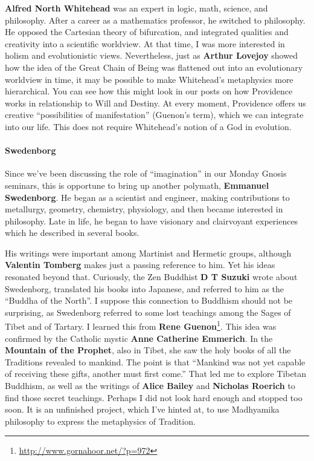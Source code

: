 \textbf{Alfred North Whitehead} was an expert in logic, math, science, and philosophy. After a career as a mathematics professor, he switched to philosophy. He opposed the Cartesian theory of bifurcation, and integrated qualities and creativity into a scientific worldview. At that time, I was more interested in holism and evolutionistic views. Nevertheless, just as \textbf{Arthur Lovejoy} showed how the idea of the Great Chain of Being was flattened out into an evolutionary worldview in time, it may be possible to make Whitehead's metaphysics more hierarchical. You can see how this might look in our posts on how Providence works in relationship to Will and Destiny. At every moment, Providence offers us creative ``possibilities of manifestation'' (Guenon's term), which we can integrate into our life. This does not require Whitehead's notion of a God in evolution.

\paragraph{Swedenborg}


Since we've been discussing the role of ``imagination'' in our Monday Gnosis seminars, this is opportune to bring up another polymath, \textbf{Emmanuel Swedenborg}. He began as a scientist and engineer, making contributions to metallurgy, geometry, chemistry, physiology, and then became interested in philosophy. Late in life, he began to have visionary and clairvoyant experiences which he described in several books.

His writings were important among Martinist and Hermetic groups, although \textbf{Valentin Tomberg} makes just a passing reference to him. Yet his ideas resonated beyond that. Curiously, the Zen Buddhist \textbf{D T Suzuki} wrote about Swedenborg, translated his books into Japanese, and referred to him as the ``Buddha of the North''. I suppose this connection to Buddhism should not be surprising, as Swedenborg referred to some lost teachings among the Sages of Tibet and of Tartary. I learned this from \textbf{Rene Guenon}\footnote{\url{http://www.gornahoor.net/?p=972}}. This idea was confirmed by the Catholic mystic \textbf{Anne Catherine Emmerich}. In the \textbf{Mountain of the Prophet}, also in Tibet, she saw the holy books of all the Traditions revealed to mankind. The point is that ``Mankind was not yet capable of receiving these gifts, another must first come.'' That led me to explore Tibetan Buddhism, as well as the writings of \textbf{Alice Bailey} and \textbf{Nicholas Roerich} to find those secret teachings. Perhaps I did not look hard enough and stopped too soon. It is an unfinished project, which I've hinted at, to use Madhyamika philosophy to express the metaphysics of Tradition.

